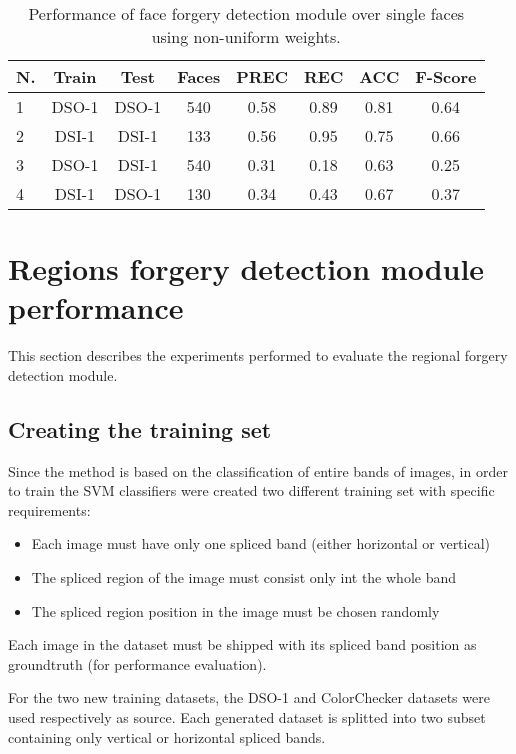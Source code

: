 \begin{table}[h!]
\centering
\begin{tabular}{l c c c c c c c} 
\hline \hline 
\textbf{N.} & \textbf{Train} & \textbf{Test} & \textbf{Faces} & \textbf{PREC} & \textbf{REC} & \textbf{ACC} & \textbf{F-Score} \\ [0.5ex]
\hline
1 & DSO-1 & DSO-1 &	540 & 0.58 & 0.89 & 0.81	& 0.64\\
2 & DSI-1 & DSI-1 &	133 & 0.56 & 0.95 & 0.75 & 0.66\\
3 &	DSO-1 & DSI-1 & 540 & 0.31 & 0.18 & 0.63 & 0.25\\ 
4 &	DSI-1 &	DSO-1 &	130 & 0.34 & 0.43 & 0.67 & 0.37\\[1ex]

\hline
\end{tabular}
\caption{Performance of face forgery detection module over single faces using non-uniform weights.}
\label{table:forgerydetections}
\end{table}


\section{Regions forgery detection module performance}

This section describes the experiments performed to evaluate the regional forgery detection module.

\subsection{Creating the training set}

Since the method is based on the classification of entire bands of images, in order to train the SVM classifiers were created two different training set with specific requirements:
\begin{itemize}
\item Each image must have only one spliced band (either horizontal or vertical)
\item The spliced region of the image must consist only int the whole band
\item The spliced region position in the image must be chosen randomly
\end{itemize}

Each image in the dataset must be shipped with its spliced band position as groundtruth (for performance evaluation).

For the two new training datasets, the DSO-1 and ColorChecker datasets were used respectively as source. Each generated dataset is splitted into two subset containing only vertical or horizontal spliced bands.

